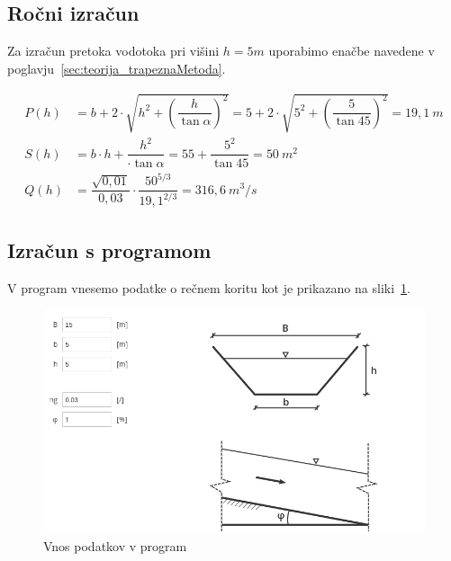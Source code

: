 \subsection{Ročni izračun}
Za izračun pretoka vodotoka pri višini $h=5m$ uporabimo enačbe navedene v poglavju~\ref{sec:teorija_trapeznaMetoda}.

\begin{ceqn}
	\begin{align}
	P(h)&= b + 2 \cdot \sqrt{h^2 + \left(\dfrac{h} {\tan\alpha} \right)^{2}} = 5 + 2 \cdot \sqrt{5^2 + \left(\dfrac{5} {\tan 45} \right)^{2}} = 19,1~m \\
	S(h)&= b \cdot h +  \dfrac{h^{2}}{\cdot\tan{\alpha}}   = 5  5 +  \dfrac{5^{2}}{\tan{45}}= 50~m^2 \\
	Q(h)&= \dfrac{\sqrt{0,01}}{0,03} \cdot \dfrac{50^{5/3}}{19,1^{2/3}} = 316,6~m^3/s
	\end{align}
\end{ceqn}




\subsection{Izračun s programom}
V program vnesemo podatke o rečnem koritu kot je prikazano na sliki~\ref{fig:trapeznaMetoda_vnosPodatkov}.

\begin{figure}[ht!]
	\begin{centering}
		\includegraphics[width=\textwidth]{slike/izracuni/trapeznaStruga.png}		
		\caption{Vnos podatkov v program}\label{fig:trapeznaMetoda_vnosPodatkov}
	\end{centering}
\end{figure}


